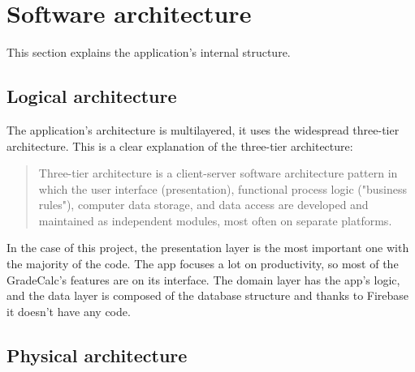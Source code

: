 \section{Software architecture}

This section explains the application's internal structure. 

\subsection{Logical architecture}

The application's architecture is multilayered, it uses the widespread three-tier architecture. This is a clear explanation of the three-tier architecture:

\begin{quote}
    Three-tier architecture is a client-server software architecture pattern in which the user interface (presentation), functional process logic ("business rules"), computer data storage, and data access are developed and maintained as independent modules, most often on separate platforms. \cite{multitier}
\end{quote}

In the case of this project, the presentation layer is the most important one with the majority of the code. The app focuses a lot on productivity, so most of the GradeCalc's features are on its interface. The domain layer has the app's logic, and the data layer is composed of the database structure and thanks to Firebase it doesn't have any code.









\newpage
\subsection{Physical architecture}

